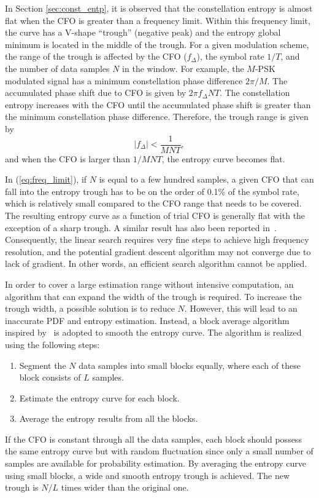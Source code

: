 \documentclass[12pt, draftclsnofoot, onecolumn]{IEEEtran}
\begin{document}
In Section \ref{sec:const_entp}, it is observed that the constellation entropy is almost flat when the CFO is greater than a frequency limit.
Within this frequency limit, the curve has a V-shape ``trough'' (negative peak) and the entropy global minimum is located in the middle of the trough.
For a given modulation scheme, the range of the trough is affected by the CFO ($f_\Delta$), the symbol rate $1/T$, and the number of data samples $N$ in the window.
For example, the \(M\)-PSK modulated signal has a minimum constellation phase difference \(2\pi/M\).
The accumulated phase shift due to CFO is given by \(2\pi f_\Delta N T\).
The constellation entropy increases with the CFO until the accumulated phase shift is greater than the minimum constellation phase difference. 
Therefore, the trough range is given by
\begin{equation}
\left| {f_\Delta } \right| < \frac{1}{{MNT}},
\label{eq:freq_limit}
\end{equation}
\noindent and when the CFO is larger than $1/MNT$, the entropy curve becomes flat.


In (\ref{eq:freq_limit}), if \(N\) is equal to a few hundred samples, a given CFO that can fall into the entropy trough has to be on the order of 0.1\% of the symbol rate, which is relatively small compared to the CFO range that needs to be covered.
The resulting entropy curve as a function of trial CFO is generally flat with the exception of a sharp trough.
A similar result has also been reported in~\cite{Pedzisz2006}. 
Consequently, the linear search requires very fine steps to achieve high frequency resolution, and the potential gradient descent algorithm may not converge due to lack of gradient.
In other words, an efficient search algorithm cannot be applied. 

In order to cover a large estimation range without intensive computation, an algorithm that can expand the width of the trough is required.
To increase the trough width, a possible solution is to reduce \(N\).
However, this will lead to an inaccurate PDF and entropy estimation.
Instead, a block average algorithm inspired by~\cite{YuanlingHuang2007} is adopted to smooth the entropy curve. The algorithm is realized using the following steps:

\begin{enumerate}
\item Segment the \(N\) data samples into small blocks equally, where each of these block consists of \(L\) samples. 
\item Estimate the entropy curve for each block.
\item Average the entropy results from all the blocks.
\end{enumerate}
If the CFO is constant through all the data samples, each block should possess the same entropy curve but with random fluctuation since only a small number of samples are available for probability estimation.
By averaging the entropy curve using small blocks, a wide and smooth entropy trough is achieved.
The new trough is $N/L$ times wider than the original one.
\end{document}
